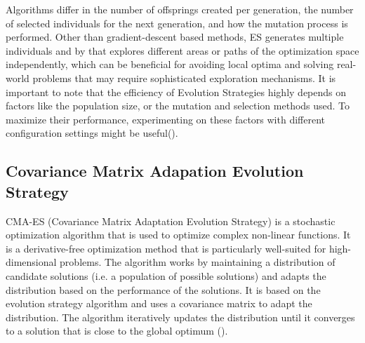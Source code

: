 Algorithms differ in the number of offsprings created per generation, the number of selected individuals for the next generation, and how the mutation process is performed. Other than gradient-descent based methods, ES generates multiple individuals and by that explores different areas or paths of the optimization space independently, which can be beneficial for avoiding local optima and solving real-world problems that may require sophisticated exploration mechanisms. It is important to note that the efficiency of Evolution Strategies highly depends on factors like the population size, or the mutation and selection methods used. To maximize their performance, experimenting on these factors with different configuration settings might be useful(\cite{salimans_evolution_2017}).

\subsection{Covariance Matrix Adapation Evolution Strategy}
CMA-ES (Covariance Matrix Adaptation Evolution Strategy) is a stochastic optimization algorithm that is used to optimize complex non-linear functions. It is a derivative-free optimization method that is particularly well-suited for high-dimensional problems. The algorithm works by maintaining a distribution of candidate solutions (i.e. a population of possible solutions) and adapts the distribution based on the performance of the solutions. It is based on the evolution strategy algorithm and uses a covariance matrix to adapt the distribution. The algorithm iteratively updates the distribution until it converges to a solution that is close to the global optimum (\cite{akimoto_theoretical_2012}).

